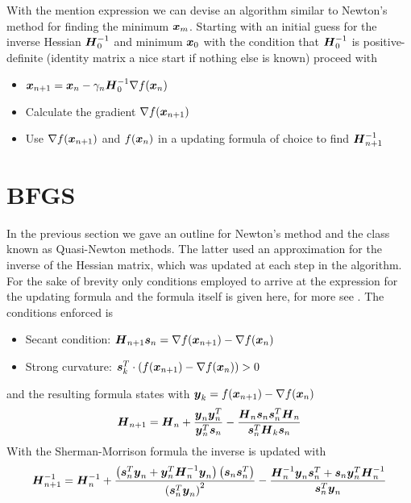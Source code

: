     With the mention expression we can devise an algorithm similar to Newton's
    method for finding the minimum $\boldsymbol{{x}}_m$. Starting with an initial guess
    for the inverse Hessian $\boldsymbol{{H}}^{-1}_0$ and minimum $\boldsymbol{{x}}_0$ with the
    condition that $\boldsymbol{{H}}^{-1}_0$ is positive-definite (identity matrix a
    nice start if nothing else is known) proceed with
        \begin{itemize}
            \item $\boldsymbol{{x}}_{n+1} = \boldsymbol{{x}}_n -\gamma_n\boldsymbol{{H}}^{-1}_0\nabla
                f(\boldsymbol{{x}}_n)$
            \item Calculate the gradient $\nabla f(\boldsymbol{{x}}_{n+1})$
            \item Use $\nabla f(\boldsymbol{{x}}_{n+1})$ and $f(\boldsymbol{{x}}_n)$ in a
                updating formula of choice to find $\boldsymbol{{H}}^{-1}_{n+1}$
        \end{itemize}

\section{BFGS\label{sec:BFGS}}
    In the previous section we gave an outline for Newton's method and the
    class known as Quasi-Newton methods. The latter used an approximation for
    the inverse of the Hessian matrix, which was updated at each step in the
    algorithm. For the sake of brevity only conditions employed to arrive at
    the expression for the updating formula and the formula itself is given
    here, for more see \cite{BFGSB, BFGSF, BFGSG, BFGSS, numOptNocWrig}. The
    conditions enforced is
        \begin{itemize}
            \item Secant condition: $\boldsymbol{{H}}_{n+1} \boldsymbol{{s}}_n = \nabla
                f(\boldsymbol{{x}}_{n+1}) - \nabla f(\boldsymbol{{x}}_n)$
            \item Strong curvature: $\boldsymbol{{s}}^T_k\cdot (f(\boldsymbol{{x}}_{n+1}) -
                \nabla f(\boldsymbol{{x}}_n)) > 0$
        \end{itemize}
    and the resulting formula states with $\boldsymbol{{y}}_k = f(\boldsymbol{{x}}_{n+1}) -
    \nabla f(\boldsymbol{{x}}_n)$
        \begin{equation}
            \boldsymbol{{H}}_{n+1} = \boldsymbol{{H}}_n +
            \frac{\boldsymbol{{y}}_n\boldsymbol{{y}}^T_n}{\boldsymbol{{y}}^T_n \boldsymbol{{s}}_n} -
            \frac{\boldsymbol{{H}}_n\boldsymbol{{s}}_n\boldsymbol{{s}}^T_n\boldsymbol{{H}}_n}
            {\boldsymbol{{s}}^T_n\boldsymbol{{H}}_k\boldsymbol{{s}}_n}
            \label{eq:BFGSdef}
        \end{equation}
    With the Sherman-Morrison formula\cite{shermorInv} the inverse is updated
    with
        \begin{equation}
            \boldsymbol{{H}}^{-1}_{n+1} = \boldsymbol{{H}}^{-1}_n +
            \frac{\left(\boldsymbol{{s}}^T_n\boldsymbol{{y}}_n +
            \boldsymbol{{y}}^T_n\boldsymbol{{H}}^{-1}_n\boldsymbol{{y}}_n\right)
            \left(\boldsymbol{{s}}_n\boldsymbol{{s}}^T_n\right)}
            {\left(\boldsymbol{{s}}^T_n\boldsymbol{{y}}_n\right)^2} -
            \frac{\boldsymbol{{H}}^{-1}_n\boldsymbol{{y}}_n\boldsymbol{{s}}^T_n +
            \boldsymbol{{s}}_n\boldsymbol{{y}}^T_n\boldsymbol{{H}}^{-1}_n}{\boldsymbol{{s}}^T_n\boldsymbol{{y}}_n}
            \label{eq:shermanmorrisondef}
        \end{equation}

